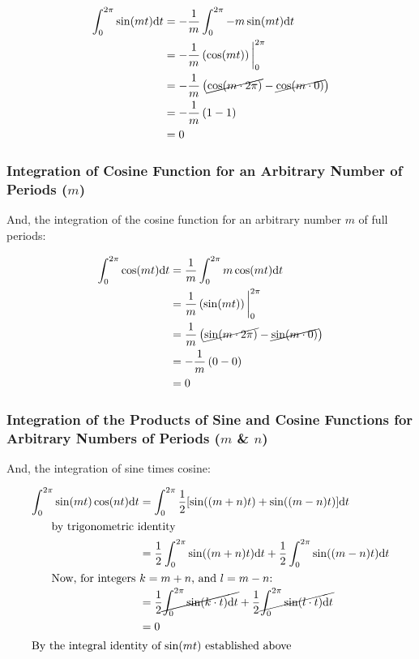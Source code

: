 \documentclass[10pt]{article} %
\begin{document}
\begin{align*}
    \int_0^{2\pi} \sin(mt)\mathrm{d}t & = -\frac1m\int_0^{2\pi}-m\sin(mt)\mathrm{d}t \\
    & = -\frac1m\left(\cos(mt)\right)\bigg\rvert_0^{2\pi} \\
    & = -\frac1m\left(\cancel{\cos(m\cdot2\pi)} - \cancel{\cos(m\cdot 0)}\right) \\
    & = -\frac1m\left(1 - 1\right) \\
    & = 0
\end{align*}

\subsubsection*{Integration of Cosine Function for an Arbitrary Number of Periods ($m$)}

And, the integration of the cosine function for an arbitrary number $m$ of full periods:

\begin{align*}
    \int_0^{2\pi} \cos(mt)\mathrm{d}t & = \frac1m\int_0^{2\pi}m\cos(mt)\mathrm{d}t \\
    & = \frac1m\left(\sin(mt)\right)\bigg\rvert_0^{2\pi} \\
    & = \frac1m\left(\cancel{\sin(m\cdot2\pi)} - \cancel{\sin(m\cdot 0)}\right) \\
    & = -\frac1m\left(0 - 0\right) \\
    & = 0
\end{align*}

\subsubsection*{Integration of the Products of Sine and Cosine Functions for Arbitrary Numbers of Periods ($m$ \& $n$)}


And, the integration of sine times cosine:

\begin{align*}
    \int_0^{2\pi}\sin(mt)\cos(nt)\mathrm{d}t & = \int_0^{2\pi}\frac12[\sin((m+n)t) +\sin((m-n)t)]\mathrm{d}t \\
    \intertext{\hspace{0.5cm} by trigonometric identity}
    & = \frac12 \int_0^{2\pi}\sin((m+n)t)\mathrm{d}t + \frac12 \int_0^{2\pi}\sin((m-n)t)\mathrm{d}t\\
    \intertext{\hspace{0.5cm} Now, for integers $k=m+n$, and $l=m-n$:}
    & = \frac12 \cancel{\int_0^{2\pi}\sin(k\cdot t)\mathrm{d}t} + \frac12 \cancel{\int_0^{2\pi}\sin(l\cdot t)\mathrm{d}t} \\
    & = 0 \\
    \intertext{By the integral identity of $\sin(mt)$ established above}
\end{align*}
\end{document}
